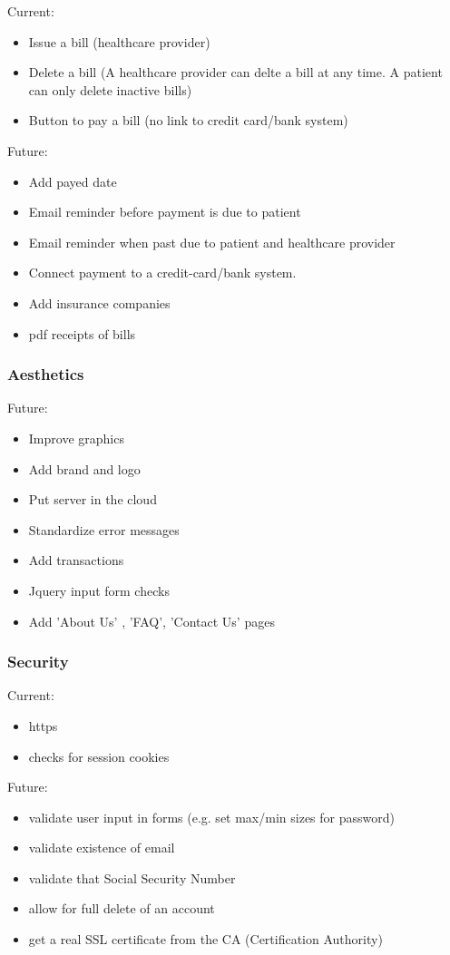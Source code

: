 \documentclass[12pt]{report}
\begin{document}
Current:
\begin{itemize}
\item Issue a bill (healthcare provider)
\item Delete a bill (A healthcare provider can delte a bill at any time. A patient can only delete inactive bills)
\item Button to pay a bill (no link to credit card/bank system)
\end{itemize}
Future:
\begin{itemize}
\item Add payed date
\item Email reminder before payment is due to patient
\item Email reminder when past due to patient and healthcare provider
\item Connect payment to a credit-card/bank system.
\item Add insurance companies
\item pdf receipts of bills
\end{itemize}

\subsubsection{Aesthetics}
Future: 
\begin{itemize}
\item Improve graphics
\item Add brand and logo
\item Put server in the cloud
\item Standardize error messages
\item Add transactions
\item Jquery input form checks
\item Add 'About Us' , 'FAQ', 'Contact Us' pages 
\end{itemize}

\subsubsection{Security}
Current:
\begin{itemize}
\item https
\item checks for session cookies
\end{itemize}
Future: 
\begin{itemize}
\item validate user input in forms (e.g. set max/min sizes for password)
\item validate existence of email
\item validate that Social Security Number
\item allow for full delete of an account
\item get a real SSL certificate from the CA (Certification Authority)
\end{itemize}
\end{document}
